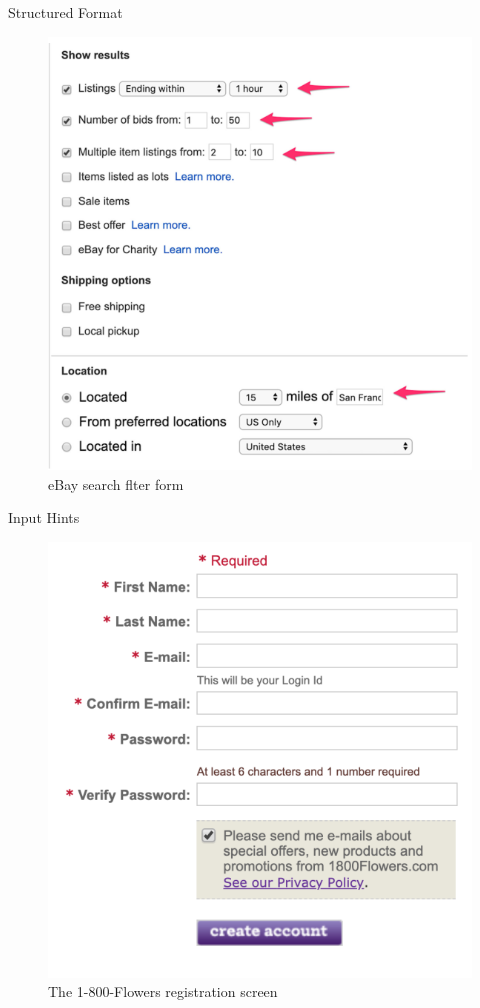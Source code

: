 \documentclass{beamer}
\begin{document}
\begin{frame}[t]{Structured Format}
	\begin{figure}[h]
		\centering
		\includegraphics[scale=0.6]{images/lec08-pic40.png}
		\caption{eBay search flter form}
	\end{figure}
\end{frame}

\begin{frame}[t]{Input Hints}
	\begin{figure}[h]
		\centering
		\includegraphics[scale=0.6]{images/lec08-pic41.png}
		\caption{The 1-800-Flowers registration screen}
	\end{figure}
\end{frame}
\end{document}

